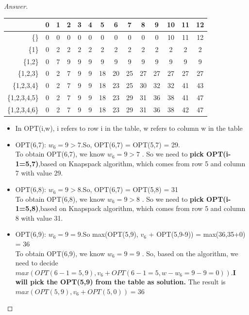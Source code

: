 \documentclass[11pt]{article}
\theoremstyle{definition}
\theoremstyle{definition}
\theoremstyle{definition}
\begin{document}
\begin{proof}[Answer]
\begin{tabular}{r|c|c|c|c|c|c|c|c|c|c|c|c|c}
          	  &0& 1  & 2 &3 &4 &5 &6&7 &8 &9&10&11&12 \\\hline
	 \{\}  & 0  & 0 &0 &0 &0 &0&0 &0 &0 &0&10&11&12\\\hline
                
       \{1\}  & 0  & 2 &2 &2 &2 &2& 2& 2& 2&2&2&2&2\\\hline
         
        \{1,2\}  & 0  & 7 &9 &9 &9 &9&9 &9 &9 &9&9&9&9\\\hline

        \{1,2,3\}  & 0  & 2 &7 &9 &9 &18&20 &25 &27 &27&27&27&27\\\hline

        \{1,2,3,4\}  & 0  & 2 &7 &9 &9 &18&23 &25 &30 &32&32&41&43\\\hline

       \{1,2,3,4,5\}  & 0  & 2 &7 &9 &9 &18&23 &29 &31 &36&38&41&47\\\hline

        \{1,2,3,4,6\}  & 0  & 2 &7 &9 &9 &18&23 &29 &31 &36&38&42&47\\\hline

\end{tabular}
\begin{itemize}
\item In OPT(i,w), i refers to row i in the table, w refers to column w in the table

\item OPT(6,7): $w_6=9 > 7.$So, OPT(6,7) = OPT(5,7) = 29.\\
To obtain OPT(6,7), we know $w_6 = 9>7$ . So we need to \textbf{pick OPT(i-1=5,7)},based on Knapspack algorithm, which comes from row 5 and column 7 with value 29.

\item OPT(6,8): $w_6=9 > 8.$So, OPT(6,7) = OPT(5,8) = 31\\
To obtain OPT(6,8), we know $w_6 = 9>8$ . So we need to \textbf{pick OPT(i-1=5,8)},based on Knapspack algorithm, which comes from row 5 and column 8 with value 31.

\item OPT(6,9): $w_6 =9 =9.$So max(OPT(5,9), $v_6$ + OPT(5,9-9)) = max(36,35+0) = 36\\
 To obtain OPT(6,9), we know $w_6 = 9=9$ . So, based on the algorithm, we need to decide $max(OPT(6-1=5,9), v_6 + OPT(6-1=5, w-w_6 = 9-9=0))$.\textbf{I will pick the OPT(5,9) from the table as solution.} The result is $max(OPT(5,9), v_6 + OPT(5, 0)) =  36$


\end{itemize}
\end{proof}
\end{document}

